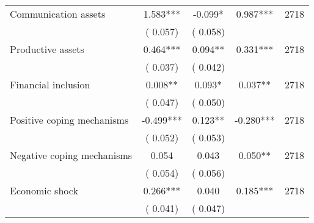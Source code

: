 \begin{tabular}{l*{4}{c}}
 Communication assets &              1.583*** &        -0.099* &           0.987*** & 2718                       \\  
                 &        (       0.057)                   &        (       0.058)                        &                                                             &                                                      \\      

 Productive assets &              0.464*** &         0.094** &           0.331*** & 2718                       \\  
                 &        (       0.037)                   &        (       0.042)                        &                                                             &                                                      \\      

 Financial inclusion &              0.008** &         0.093* &           0.037** & 2718                       \\  
                 &        (       0.047)                   &        (       0.050)                        &                                                             &                                                      \\      

 Positive coping mechanisms &             -0.499*** &         0.123** &          -0.280*** & 2718                       \\  
                 &        (       0.052)                   &        (       0.053)                        &                                                             &                                                      \\      

 Negative coping mechanisms &              0.054 &         0.043 &           0.050** & 2718                       \\  
                 &        (       0.054)                   &        (       0.056)                        &                                                             &                                                      \\      

 Economic shock &              0.266*** &         0.040 &           0.185*** & 2718                       \\  
                 &        (       0.041)                   &        (       0.047)                        &                                                             &                                                      \\      


\end{tabular}
